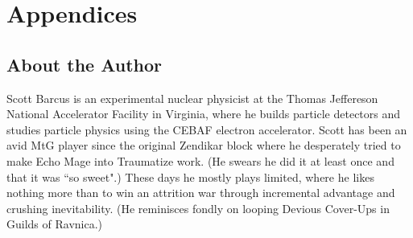 \documentclass[oneside]{book}   %
\begin{document}
\section*{Appendices}
\renewcommand{\thesubsection}{\Alph{subsection}}
\subsection{About the Author}

Scott Barcus is an experimental nuclear physicist at the Thomas Jeffereson National Accelerator Facility in Virginia, where he builds particle detectors and studies particle physics using the CEBAF electron accelerator. Scott has been an avid MtG player since the original Zendikar block where he desperately tried to make Echo Mage into Traumatize work. (He swears he did it at least once and that it was ``so sweet".) These days he mostly plays limited, where he likes nothing more than to win an attrition war through incremental advantage and crushing inevitability. (He reminisces fondly on looping Devious Cover-Ups in Guilds of Ravnica.)  




\end{document}
